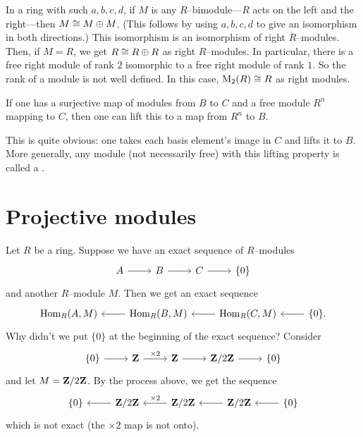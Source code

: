 \documentclass[11pt, oneside,margin=1in]{article}
\begin{document}
In a ring with such $a,b,c,d$, if $M$ is any $R$--{bimodule}---$R$ acts on the left and the right---then $M\cong M\oplus M$. (This follows by using $a,b,c,d$ to give an isomorphism in both directions.) This isomorphism is an isomorphism of right $R$--modules. Then, if $M=R$, we get $R\cong R\oplus R$ as right $R$--modules. In particular, there is a free right module of rank $2$ isomorphic to a free right module of rank $1$. So the rank of a module is not well defined. In this case, $\operatorname{M}_2(R)\cong R$ as right modules.

If one has a surjective map of modules from $B$ to $C$ and a free module $R^n$ mapping to $C$, then one can lift this to a map from $R^n$ to $B$.
\iffalse
\[
\begin{tikzcd}
	R^n \arrow[dashed]{d} \arrow[dr] & \\
	B \arrow[two heads]{r} & C
\end{tikzcd}
\]
\fi
This is quite obvious: one takes each basis element's image in $C$ and lifts it to $B$. More generally, any module (not necessarily free) with this lifting property is called a .

\section{Projective modules}\label{projmod}
Let $R$ be a ring. Suppose we have an exact sequence of $R$--modules
\[
\begin{tikzcd}
A \arrow[r] & B\arrow[r]& C\arrow[r] & \{0\}
\end{tikzcd}
\]
and another $R$--module $M$. Then we get an exact sequence
\[
\begin{tikzcd}
\Hom_R(A,M) & \Hom_R(B,M) \arrow[l]& \Hom_R(C,M)\arrow[l] & \{0\}. \arrow[l]
\end{tikzcd}
\]
Why didn't we put $\{0\}$ at the beginning of the exact sequence? Consider
\[
\begin{tikzcd}
\{0\} \arrow[r] & \Z \arrow[r, "\times 2"] & \Z\arrow[r]& \Zmod 2\arrow[r] & \{0\}
\end{tikzcd}
\]
and let $M=\mathbf Z / 2\mathbf Z$. By the process above, we get the sequence
\[
\begin{tikzcd}
\{0\} & \Zmod 2 \arrow[l]& \Zmod 2\arrow[l,swap, "\times 2"] & \Zmod 2 \arrow[l] & \{0\} \arrow[l]
\end{tikzcd}
\]
which is not exact (the $\times 2$ map is not onto). 
\end{document}

